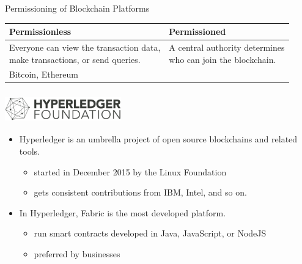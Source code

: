\documentclass[xcolor=svgnames]{beamer}
\begin{document}
\begin{frame}{Permissioning of Blockchain Platforms}

\begin{table}
\small
\renewcommand*{\arraystretch}{2}
\begin{tabular}{ll}
Permissionless                                                              & Permissioned                                                \\ \hline
\makecell[l]{Everyone can view the transaction data, \\make transactions, or send queries.} & \makecell[l]{A central authority determines \\who can join the blockchain.} \\
Bitcoin, Ethereum                                                           & \onslide<2->{Hyperledger Fabric}                                          \\
\end{tabular}
\end{table}

\end{frame}

\begin{frame}
\frametitle{
\includegraphics[height=1cm]{hyperledgerfoundation_horizontal-dark.png}
\qquad
{}
}

\begin{itemize}
\item Hyperledger is an umbrella project of open source blockchains and related tools.
\begin{itemize}
\item started in December 2015 by the Linux Foundation
\item gets consistent contributions from IBM, Intel, and so on.
\end{itemize}

\item<2-> In Hyperledger, Fabric is the most developed platform.
\begin{itemize}
\item run smart contracts developed in Java, JavaScript, or NodeJS
\item preferred by businesses
\end{itemize}
\end{itemize}
\end{frame}
\end{document}
